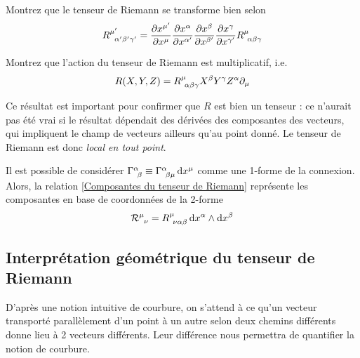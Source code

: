 \begin{exerc}
    Montrez que le tenseur de Riemann se transforme bien selon
    \begin{equation}
        R\indices{^{\mu '}_{\!\!\alpha ' \beta ' \gamma'}} = \frac{\partial x^{\mu '}}{\partial x^{\mu} }\frac{\partial x^{\alpha}}{\partial x^{\alpha '} }\frac{\partial x^{\beta}}{\partial x^{\beta '} }\frac{\partial x^{\gamma}}{\partial x^{\gamma '} }R\indices{^{\mu}_{\!\alpha \beta \gamma}}
    \end{equation}
\end{exerc}
\begin{exerc}
    Montrez que l'action du tenseur de Riemann est multiplicatif, i.e.
    \begin{equation}
        R(X,Y,Z) = R\indices{^\mu _\!_\alpha_\beta_\gamma} X^\beta Y^\gamma Z^\alpha \pd_\mu
    \end{equation}
\end{exerc}
Ce résultat est important pour confirmer que $R$ est bien un tenseur : ce n'aurait pas été vrai si le résultat dépendait des dérivées des composantes des vecteurs, qui impliquent le champ de vecteurs ailleurs qu'au point donné. Le tenseur de Riemann est donc \emph{local en tout point}.
\begin{rmk}
    Il est possible de considérer $\Gamma\indices{^\alpha_{\!\beta}} \equiv \Gamma\indices{^\alpha_{\!\beta \mu}}\, \td x^\mu$ comme une 1-forme de la connexion. Alors, la relation \ref{Composantes du tenseur de Riemann} représente les composantes en base de coordonnées de la 2-forme 
    \begin{equation}
        \mathcal{R}\indices{^\mu_\nu} = R\indices{^\mu_\!_\nu_\alpha_\beta}\, \td x^\alpha \wedge \td x^\beta
    \end{equation}
    
\end{rmk}
\subsection{Interprétation géométrique du tenseur de Riemann}

D'après une notion intuitive de courbure, on s'attend à ce qu'un vecteur transporté parallèlement d'un point à un autre selon deux chemins différents donne lieu à 2 vecteurs différents. Leur différence nous permettra de quantifier la notion de courbure.  

